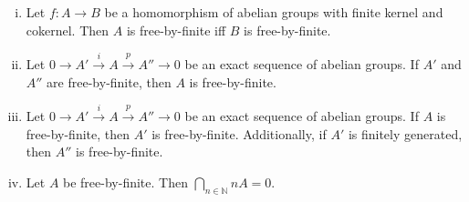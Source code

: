 \begin{lemma}\label{5.2}
\begin{enumerate}[(i)]
\item Let $f: A\to B$ be a homomorphism of abelian groups with finite kernel and cokernel. Then $A$ is free-by-finite iff $B$ is free-by-finite.
\item Let $0\longrightarrow A'\stackrel{i}{\longrightarrow}A\stackrel{p}{\longrightarrow}A''\longrightarrow 0$ be an exact sequence of abelian groups. If $A'$ and $A''$ are free-by-finite, then $A$ is free-by-finite. 
\item Let $0\longrightarrow A'\stackrel{i}{\longrightarrow}A\stackrel{p}{\longrightarrow}A''\longrightarrow 0$ be an exact sequence of abelian groups. If $A$ is free-by-finite, then $A'$ is free-by-finite. Additionally, if $A'$ is finitely generated, then $A''$ is free-by-finite.
\item Let $A$ be free-by-finite. Then $\bigcap_{n\in\mathbb{N}}nA=0$.
\end{enumerate}
\end{lemma}

